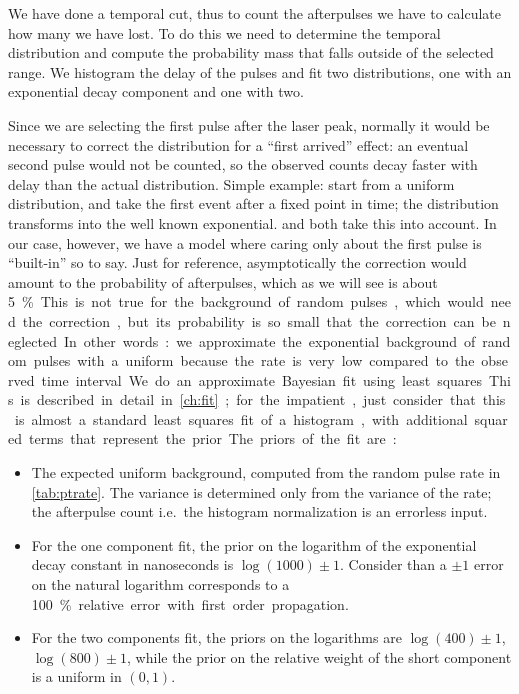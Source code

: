 We have done a temporal cut, thus to count the afterpulses we have to calculate
how many we have lost. To do this we need to determine the temporal
distribution and compute the probability mass that falls outside of the
selected range. We histogram the delay of the pulses and fit two distributions,
one with an exponential decay component and one with two.

Since we are selecting the first pulse after the laser peak, normally it would
be necessary to correct the distribution for a ``first arrived'' effect: an
eventual second pulse would not be counted, so the observed counts decay faster
with delay than the actual distribution. Simple example: start from a uniform
distribution, and take the first event after a fixed point in time; the
distribution transforms into the well known exponential. \cite[2]{cova1991} and
\cite[4]{garutti2014} both take this into account. In our case, however, we
have a model where caring only about the first pulse is ``built-in'' so to say.
Just for reference, asymptotically the correction would amount to the
probability of afterpulses, which as we will see is about \SI{5}\%.

This is not true for the background of random pulses, which would need the
correction, but its probability is so small that the correction can be
neglected. In other words: we approximate the exponential background of random
pulses with a uniform because the rate is very low compared to the observed
time interval.

We do an approximate Bayesian fit using least squares. This is described in
detail in \autoref{ch:fit}; for the impatient, just consider that this is
almost a standard least squares fit of a histogram, with additional squared
terms that represent the prior.

The priors of the fit are:
%
\begin{itemize}
    
    \item The expected uniform background, computed from the random pulse rate
    in \autoref{tab:ptrate}. The variance is determined only from the variance
    of the rate; the afterpulse count i.e.\ the histogram normalization is an
    errorless input.
    
    \item For the one component fit, the prior on the logarithm of the
    exponential decay constant in nanoseconds is $\log(1000) \pm 1$. Consider
    than a $\pm 1$ error on the natural logarithm corresponds to a \SI{100}\%
    relative error with first order propagation.
    
    \item For the two components fit, the priors on the logarithms are
    $\log(400) \pm 1$, $\log(800) \pm 1$, while the prior on the relative
    weight of the short component is a uniform in $(0, 1)$.
    
\end{itemize}

